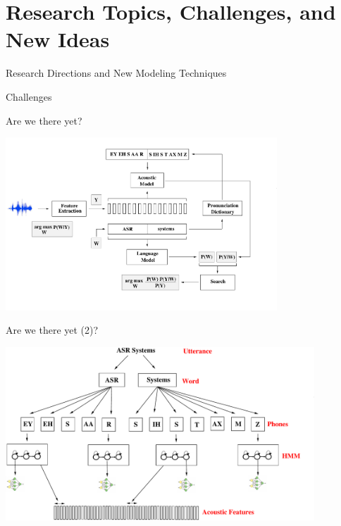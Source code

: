 \section{Research Topics, Challenges, and New Ideas}

\begin{frame}
  \begin{center}
    {\color{Maroon}\Huge Research Directions and New Modeling Techniques\par}
  \end{center}
\end{frame}


\begin{frame}
  \begin{center}
    {\color{Maroon}\Huge Challenges}
  \end{center}
\end{frame}

\begin{frame}{Are we there yet?}
  \begin{center}
    \includegraphics[height=65mm]{figures/ASR9}
  \end{center}
\end{frame}

\begin{frame}{Are we there yet (2)?}
  \begin{center}
    \includegraphics[height=65mm]{figures/am-mlp}
  \end{center}
\end{frame}

